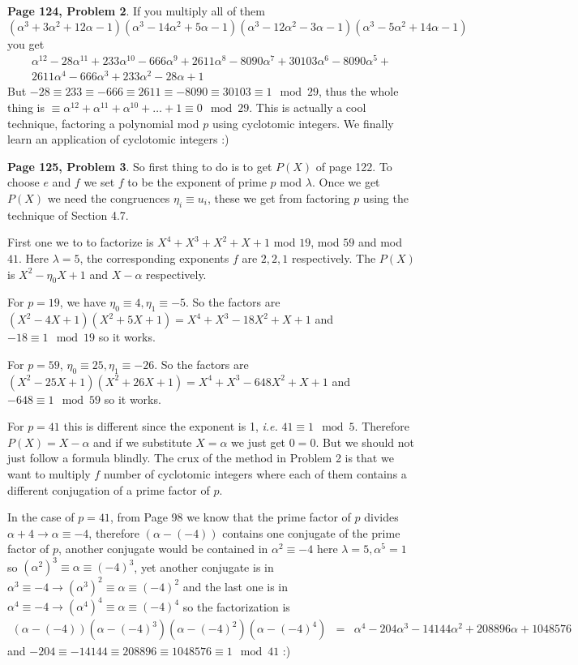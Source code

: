 \documentclass[aps,preprint,preprintnumbers,nofootinbib,showpacs,prd]{revtex4-1}
\newcommand{\ie}{{\it i.e.} }
\newcommand{\nbea}{\begin{eqnarray*}}
\newcommand{\neea}{\end{eqnarray*}}
\begin{document}
{\bf Page 124, Problem 2}. If you multiply all of them $(\alpha^3 + 3\alpha^2 + 12\alpha - 1)(\alpha^3 - 14\alpha^2 + 5\alpha - 1)(\alpha^3-12\alpha^2-3\alpha-1)(\alpha^3 - 5\alpha^2 + 14\alpha - 1)$ you get
%
\nbea
\alpha^{12}-28\alpha^{11}+233\alpha^{10}-666\alpha^9+2611\alpha^8-8090\alpha^7+30103\alpha^6-8090\alpha^5+\\
2611\alpha^4-666\alpha^3+233\alpha^2-28\alpha+1
\neea
%
But $-28 \equiv 233 \equiv -666 \equiv 2611 \equiv -8090 \equiv 30103 \equiv 1 \mod{29}$, thus the whole thing is $\equiv \alpha^{12} + \alpha^{11} + \alpha^{10} + \dots + 1 \equiv 0 \mod{29}$. This is actually a cool technique, factoring a polynomial mod $p$ using cyclotomic integers. We finally learn an application of cyclotomic integers :)

{\bf Page 125, Problem 3}. So first thing to do is to get $P(X)$ of page 122. To choose $e$ and $f$ we set $f$ to be the exponent of prime $p$ mod $\lambda$. Once we get $P(X)$ we need the congruences $\eta_i \equiv u_i$, these we get from factoring $p$ using the technique of Section 4.7.

First one we to to factorize is $X^4 + X^3 + X^2 + X + 1$ mod $19$, mod $59$ and mod $41$. Here $\lambda = 5$, the corresponding exponents $f$ are $2, 2, 1$ respectively. The $P(X)$ is $X^2 - \eta_0X + 1$ and $X - \alpha$ respectively.

For $p = 19$, we have $\eta_0 \equiv 4, \eta_1 \equiv -5$. So the factors are $(X^2 - 4X + 1)(X^2 +5X + 1) = X^4+X^3-18X^2+X+1$ and $-18 \equiv 1 \mod{19}$ so it works.

For $p = 59$, $\eta_0 \equiv 25, \eta_1 \equiv -26$. So the factors are $(X^2 - 25X + 1)(X^2 +26X + 1) = X^4+X^3-648X^2+X+1$ and $-648 \equiv 1 \mod{59}$ so it works.

For $p = 41$ this is different since the exponent is 1, \ie $41 \equiv 1 \mod{5}$. Therefore $P(X) = X - \alpha$ and if we substitute $X = \alpha$ we just get $0 = 0$. But we should not just follow a formula blindly. The crux of the method in Problem 2 is that we want to multiply $f$ number of cyclotomic integers where each of them contains a different conjugation of a prime factor of $p$.

In the case of $p = 41$, from Page 98 we know that the prime factor of $p$ divides $\alpha + 4 \to \alpha \equiv -4$, therefore $(\alpha - (-4))$ contains one conjugate of the prime factor of $p$, another conjugate would be contained in $\alpha^2 \equiv -4$ here $\lambda = 5, \alpha^5 = 1$ so $(\alpha^2)^3 \equiv \alpha \equiv (-4)^3$, yet another conjugate is in $\alpha^3 \equiv -4 \to (\alpha^3)^2 \equiv \alpha \equiv (-4)^2$ and the last one is in $\alpha^4 \equiv -4 \to (\alpha^4)^4 \equiv \alpha \equiv (-4)^4$ so the factorization is
%
\nbea
(\alpha -(-4))(\alpha -(-4)^3)(\alpha -(-4)^2)(\alpha -(-4)^4) & = & \alpha^4-204\alpha^3-14144\alpha^2+208896\alpha+1048576
\neea
%
and $-204 \equiv -14144 \equiv 208896 \equiv 1048576 \equiv 1 \mod{41}$ :)
\end{document}
